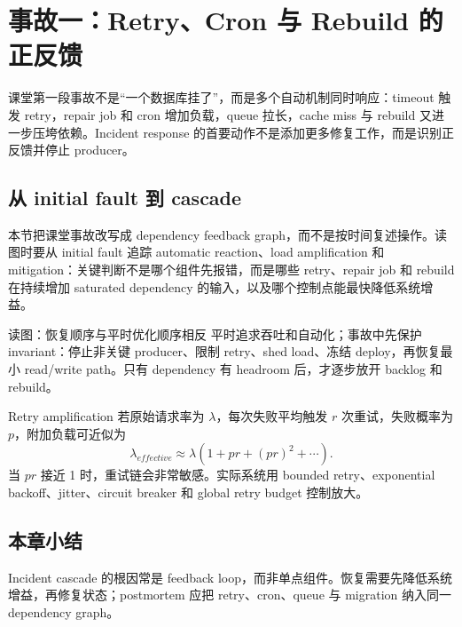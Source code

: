 \section{事故一：Retry、Cron 与 Rebuild 的正反馈}

课堂第一段事故不是“一个数据库挂了”，而是多个自动机制同时响应：timeout 触发 retry，repair job 和 cron 增加负载，queue 拉长，cache miss 与 rebuild 又进一步压垮依赖。Incident response 的首要动作不是添加更多修复工作，而是识别正反馈并停止 producer。

\subsection{从 initial fault 到 cascade}

本节把课堂事故改写成 dependency feedback graph，而不是按时间复述操作。读图时要从 initial fault 追踪 automatic reaction、load amplification 和 mitigation：关键判断不是哪个组件先报错，而是哪些 retry、repair job 和 rebuild 在持续增加 saturated dependency 的输入，以及哪个控制点能最快降低系统增益。


\begin{knowledgebox}{读图：恢复顺序与平时优化顺序相反}
平时追求吞吐和自动化；事故中先保护 invariant：停止非关键 producer、限制 retry、shed load、冻结 deploy，再恢复最小 read/write path。只有 dependency 有 headroom 后，才逐步放开 backlog 和 rebuild。
\end{knowledgebox}

\begin{importantbox}{Retry amplification}
若原始请求率为 $\lambda$，每次失败平均触发 $r$ 次重试，失败概率为 $p$，附加负载可近似为
\[
\lambda_{effective}\approx \lambda(1+pr+(pr)^2+\cdots).
\]
当 $pr$ 接近 1 时，重试链会非常敏感。实际系统用 bounded retry、exponential backoff、jitter、circuit breaker 和 global retry budget 控制放大。
\end{importantbox}


\subsection{本章小结}

Incident cascade 的根因常是 feedback loop，而非单点组件。恢复需要先降低系统增益，再修复状态；postmortem 应把 retry、cron、queue 与 migration 纳入同一 dependency graph。

